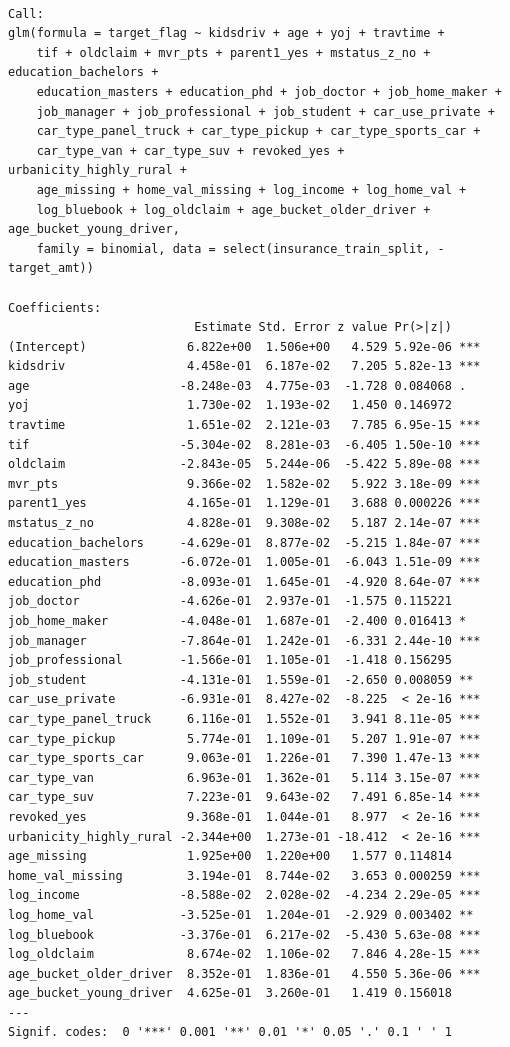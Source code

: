 \documentclass[
  11pt]{article}
\begin{document}
\begin{verbatim}

Call:
glm(formula = target_flag ~ kidsdriv + age + yoj + travtime + 
    tif + oldclaim + mvr_pts + parent1_yes + mstatus_z_no + education_bachelors + 
    education_masters + education_phd + job_doctor + job_home_maker + 
    job_manager + job_professional + job_student + car_use_private + 
    car_type_panel_truck + car_type_pickup + car_type_sports_car + 
    car_type_van + car_type_suv + revoked_yes + urbanicity_highly_rural + 
    age_missing + home_val_missing + log_income + log_home_val + 
    log_bluebook + log_oldclaim + age_bucket_older_driver + age_bucket_young_driver, 
    family = binomial, data = select(insurance_train_split, -target_amt))

Coefficients:
                          Estimate Std. Error z value Pr(>|z|)    
(Intercept)              6.822e+00  1.506e+00   4.529 5.92e-06 ***
kidsdriv                 4.458e-01  6.187e-02   7.205 5.82e-13 ***
age                     -8.248e-03  4.775e-03  -1.728 0.084068 .  
yoj                      1.730e-02  1.193e-02   1.450 0.146972    
travtime                 1.651e-02  2.121e-03   7.785 6.95e-15 ***
tif                     -5.304e-02  8.281e-03  -6.405 1.50e-10 ***
oldclaim                -2.843e-05  5.244e-06  -5.422 5.89e-08 ***
mvr_pts                  9.366e-02  1.582e-02   5.922 3.18e-09 ***
parent1_yes              4.165e-01  1.129e-01   3.688 0.000226 ***
mstatus_z_no             4.828e-01  9.308e-02   5.187 2.14e-07 ***
education_bachelors     -4.629e-01  8.877e-02  -5.215 1.84e-07 ***
education_masters       -6.072e-01  1.005e-01  -6.043 1.51e-09 ***
education_phd           -8.093e-01  1.645e-01  -4.920 8.64e-07 ***
job_doctor              -4.626e-01  2.937e-01  -1.575 0.115221    
job_home_maker          -4.048e-01  1.687e-01  -2.400 0.016413 *  
job_manager             -7.864e-01  1.242e-01  -6.331 2.44e-10 ***
job_professional        -1.566e-01  1.105e-01  -1.418 0.156295    
job_student             -4.131e-01  1.559e-01  -2.650 0.008059 ** 
car_use_private         -6.931e-01  8.427e-02  -8.225  < 2e-16 ***
car_type_panel_truck     6.116e-01  1.552e-01   3.941 8.11e-05 ***
car_type_pickup          5.774e-01  1.109e-01   5.207 1.91e-07 ***
car_type_sports_car      9.063e-01  1.226e-01   7.390 1.47e-13 ***
car_type_van             6.963e-01  1.362e-01   5.114 3.15e-07 ***
car_type_suv             7.223e-01  9.643e-02   7.491 6.85e-14 ***
revoked_yes              9.368e-01  1.044e-01   8.977  < 2e-16 ***
urbanicity_highly_rural -2.344e+00  1.273e-01 -18.412  < 2e-16 ***
age_missing              1.925e+00  1.220e+00   1.577 0.114814    
home_val_missing         3.194e-01  8.744e-02   3.653 0.000259 ***
log_income              -8.588e-02  2.028e-02  -4.234 2.29e-05 ***
log_home_val            -3.525e-01  1.204e-01  -2.929 0.003402 ** 
log_bluebook            -3.376e-01  6.217e-02  -5.430 5.63e-08 ***
log_oldclaim             8.674e-02  1.106e-02   7.846 4.28e-15 ***
age_bucket_older_driver  8.352e-01  1.836e-01   4.550 5.36e-06 ***
age_bucket_young_driver  4.625e-01  3.260e-01   1.419 0.156018    
---
Signif. codes:  0 '***' 0.001 '**' 0.01 '*' 0.05 '.' 0.1 ' ' 1


\end{verbatim}
\end{document}
